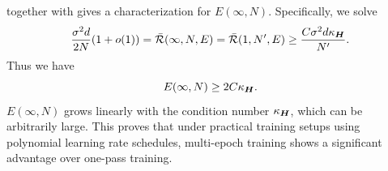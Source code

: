 


 together with  gives a characterization for $E(\infty,N)$. Specifically, we solve \[\frac{\sigma^2d}{2N}(1+o(1))=\bar{\mathcal{R}}(\infty, N, E)=\bar{\mathcal{R}}(1, N',E)\geq\frac{C\sigma^2d\kappa_{{\bm{H}}}}{N'}.\] 
Thus we have 
\[E(\infty, N)\geq 2C\kappa_{{\bm{H}}}.\]
$E(\infty, N)$ grows linearly with the condition number $\kappa_{{\bm{H}}}$, which can be arbitrarily large. This proves that under practical training setups using polynomial learning rate schedules, multi-epoch training shows a significant advantage over one-pass training.

